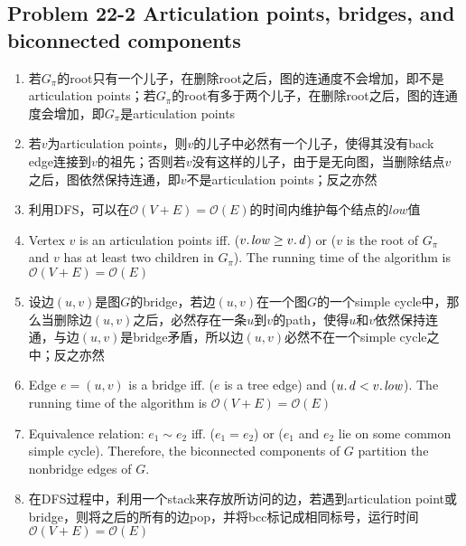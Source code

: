 \subsection*{Problem 22-2 Articulation points, bridges, and biconnected components}
\begin{enumerate}
	\item	若$G_{\pi}$的root只有一个儿子，在删除root之后，图的连通度不会增加，即不是articulation points；若$G_{\pi}$的root有多于两个儿子，在删除root之后，图的连通度会增加，即$G_{\pi}$是articulation points
	\item	若$v$为articulation points，则$v$的儿子中必然有一个儿子，使得其没有back edge连接到$v$的祖先；否则若$v$没有这样的儿子，由于是无向图，当删除结点$v$之后，图依然保持连通，即$v$不是articulation points；反之亦然
	\item	利用DFS，可以在$\mathcal{O}(V + E) = \mathcal{O}(E)$的时间内维护每个结点的$low$值
	\item	Vertex $v$ is an articulation points iff. ($\attrib{v}{low} \geq \attrib{v}{d}$) or ($v$ is the root of $G_{\pi}$ and $v$ has at least two children in $G_{\pi}$). The running time of the algorithm is $\mathcal{O}(V + E) = \mathcal{O}(E)$
	\item	设边$(u, v)$是图$G$的bridge，若边$(u, v)$在一个图$G$的一个simple cycle中，那么当删除边$(u, v)$之后，必然存在一条$u$到$v$的path，使得$u$和$v$依然保持连通，与边$(u, v)$是bridge矛盾，所以边$(u, v)$必然不在一个simple cycle之中；反之亦然
	\item	Edge $e = (u, v)$ is a bridge iff. ($e$ is a tree edge) and ($\attrib{u}{d} < \attrib{v}{low}$). The running time of the algorithm is $\mathcal{O}(V + E) = \mathcal{O}(E)$
	\item	Equivalence relation: $e_1 \sim e_2$ iff. ($e_1 = e_2$) or ($e_1$ and $e_2$ lie on some common simple cycle). Therefore, the biconnected components of $G$ partition the nonbridge edges of $G$.
	\item	在DFS过程中，利用一个stack来存放所访问的边，若遇到articulation point或bridge，则将之后的所有的边pop，并将bcc标记成相同标号，运行时间$\mathcal{O}(V + E) = \mathcal{O}(E)$
\end{enumerate}


